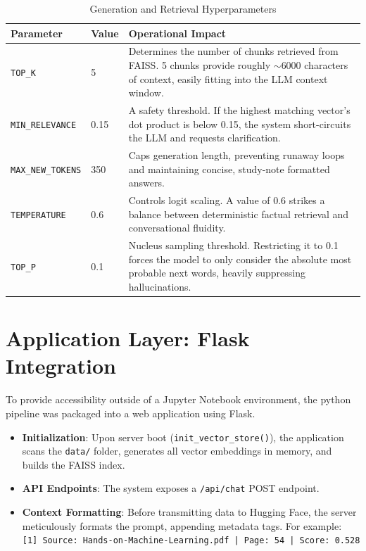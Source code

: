 \documentclass[12pt,a4paper]{article}
\begin{document}
\begin{table}[H]
    \centering
    \begin{tabular}{@{} l l p{8cm} @{}}
    \toprule
    \textbf{Parameter} & \textbf{Value} & \textbf{Operational Impact} \\
    \midrule
    \texttt{TOP\_K} & 5 & Determines the number of chunks retrieved from FAISS. 5 chunks provide roughly $\sim$6000 characters of context, easily fitting into the LLM context window. \\
    \texttt{MIN\_RELEVANCE} & 0.15 & A safety threshold. If the highest matching vector's dot product is below 0.15, the system short-circuits the LLM and requests clarification. \\
    \texttt{MAX\_NEW\_TOKENS} & 350 & Caps generation length, preventing runaway loops and maintaining concise, study-note formatted answers. \\
    \texttt{TEMPERATURE} & 0.6 & Controls logit scaling. A value of 0.6 strikes a balance between deterministic factual retrieval and conversational fluidity. \\
    \texttt{TOP\_P} & 0.1 & Nucleus sampling threshold. Restricting it to 0.1 forces the model to only consider the absolute most probable next words, heavily suppressing hallucinations. \\
    \bottomrule
    \end{tabular}
    \caption{Generation and Retrieval Hyperparameters}
    \label{tab:params}
\end{table}

\section{Application Layer: Flask Integration}
To provide accessibility outside of a Jupyter Notebook environment, the python pipeline was packaged into a web application using Flask.

\begin{itemize}
    \item \textbf{Initialization}: Upon server boot (\texttt{init\_vector\_store()}), the application scans the \texttt{data/} folder, generates all vector embeddings in memory, and builds the FAISS index.
    \item \textbf{API Endpoints}: The system exposes a \texttt{/api/chat} POST endpoint. 
    \item \textbf{Context Formatting}: Before transmitting data to Hugging Face, the server meticulously formats the prompt, appending metadata tags. For example:\\ \texttt{[1] Source: Hands-on-Machine-Learning.pdf | Page: 54 | Score: 0.528}
\end{itemize}
\end{document}
